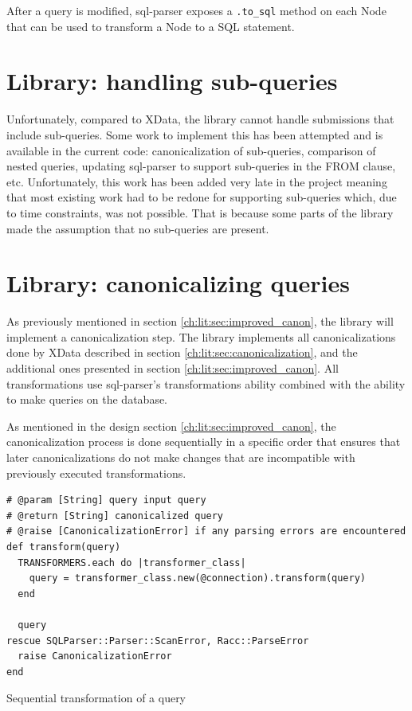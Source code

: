 After a query is modified, sql-parser exposes a \texttt{.to_sql} method on each Node that can be used to transform a Node to a SQL statement.

\section{Library: handling sub-queries}

Unfortunately, compared to XData, the library cannot handle submissions that include sub-queries. Some work to implement this has been attempted and is available in the current code: canonicalization of sub-queries, comparison of nested queries, updating sql-parser to support sub-queries in the FROM clause, etc. Unfortunately, this work has been added very late in the project meaning that most existing work had to be redone for supporting sub-queries which, due to time constraints, was not possible. That is because some parts of the library made the assumption that no sub-queries are present.

\section{Library: canonicalizing queries}

As previously mentioned in section \ref{ch:lit:sec:improved_canon}, the library will implement a canonicalization step. The library implements all canonicalizations done by XData described in section \ref{ch:lit:sec:canonicalization}, and the additional ones presented in section \ref{ch:lit:sec:improved_canon}. All transformations use sql-parser's transformations ability combined with the ability to make queries on the database.

As mentioned in the design section \ref{ch:lit:sec:improved_canon}, the canonicalization process is done sequentially in a specific order that ensures that later canonicalizations do not make changes that are incompatible with previously executed transformations. 

\begin{code}
\begin{verbatim}
# @param [String] query input query
# @return [String] canonicalized query
# @raise [CanonicalizationError] if any parsing errors are encountered
def transform(query)
  TRANSFORMERS.each do |transformer_class|
    query = transformer_class.new(@connection).transform(query)
  end

  query
rescue SQLParser::Parser::ScanError, Racc::ParseError
  raise CanonicalizationError
end
\end{verbatim}
\caption{Sequential transformation of a query}
\label{fig:sequential transformation of a query}
\end{code}

